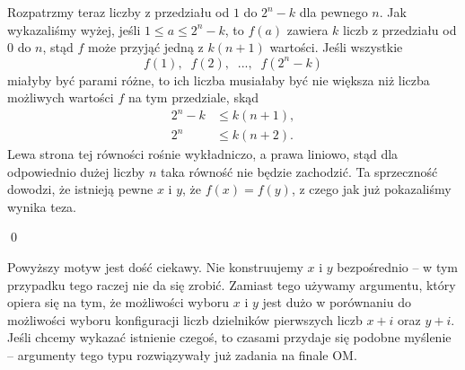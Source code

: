 \noindent
Rozpatrzmy teraz liczby z przedziału od $1$ do $2^n - k$ dla pewnego $n$. Jak wykazaliśmy wyżej, jeśli $1 \leqslant a \leqslant 2^n - k$, to $f(a)$ zawiera $k$ liczb z przedziału od $0$ do $n$, stąd $f$ może przyjąć jedną z $k(n + 1)$ wartości. Jeśli wszystkie 
\[
	f(1), \;\; f(2), \;\; ..., \;\; f(2^n - k)
\]
miałyby być parami różne, to ich liczba musiałaby być nie większa niż liczba możliwych wartości $f$ na tym przedziale, skąd
\begin{align*}
	2^n - k &\leqslant k(n + 1), \\
	2^n &\leqslant k(n + 2).
\end{align*}
Lewa strona tej równości rośnie wykładniczo, a prawa liniowo, stąd dla odpowiednio dużej liczby $n$ taka równość nie będzie zachodzić. Ta sprzeczność dowodzi, że istnieją pewne $x$ i $y$, że $f(x) = f(y)$, z czego jak już pokazaliśmy wynika teza.

\qed

\noindent
Powyższy motyw jest dość ciekawy. Nie konstruujemy $x$ i $y$ bezpośrednio -- w tym przypadku tego raczej nie da się zrobić. Zamiast tego używamy argumentu, który opiera się na tym, że możliwości wyboru $x$ i $y$ jest dużo w porównaniu do możliwości wyboru konfiguracji liczb dzielników pierwszych liczb $x + i$ oraz $y + i$. Jeśli chcemy wykazać istnienie czegoś, to czasami przydaje się podobne myślenie -- argumenty tego typu rozwiązywały już zadania na finale OM.
\vspace{10px} 
